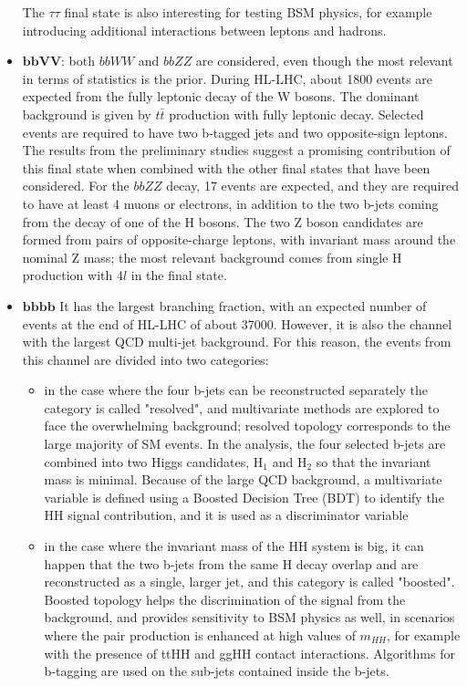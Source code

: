 \begin{itemize}
    The $\tau \tau$ final state is also interesting for testing BSM physics, for example introducing additional interactions between leptons and hadrons.
    \item $\bm{bbVV}$: both $bbWW$ and $bbZZ$ are considered, even though the most relevant in terms of statistics is the prior. During HL-LHC, about 1800 events are expected from the fully leptonic decay of the W bosons. The dominant background is given by $t\bar{t}$ production with fully leptonic decay. Selected events are required to have two b-tagged jets and two opposite-sign leptons. The results from the preliminary studies suggest a promising contribution of this final state when combined with the other final states that have been considered.
    For the $bbZZ$ decay, 17 events are expected, and they are required to have at least 4 muons or electrons, in addition to the two b-jets coming from the decay of one of the H bosons. The two Z boson candidates are formed from pairs of opposite-charge leptons, with invariant mass around the nominal Z mass; the most relevant background comes from single H production with 4$l$ in the final state.
    \item $\bm{bbbb}$ It has the largest branching fraction, with an expected number of events at the end of HL-LHC of about 37000. However, it is also the channel with the largest QCD multi-jet background. For this reason, the events from this channel are divided into two categories: 
    \begin{itemize}
        \item in the case where the four b-jets can be reconstructed separately the category is called "resolved", and multivariate methods are explored to face the overwhelming background; resolved topology corresponds to the large majority of SM events. In the analysis, the four selected b-jets are combined into two Higgs candidates, H$_1$ and H$_2$ so that the invariant mass is minimal. Because of the large QCD background, a multivariate variable is defined using a Boosted Decision Tree (BDT) to identify the HH signal contribution, and it is used as a discriminator variable
        \item in the case where the invariant mass of the HH system is big, it can happen that the two b-jets from the same H decay overlap and are reconstructed as a single, larger jet, and this category is called "boosted". Boosted topology helps the discrimination of the signal from the background, and provides sensitivity to BSM physics as well, in scenarios where the pair production is enhanced at high values of $m_{HH}$, for example with the presence of ttHH and ggHH contact interactions. Algorithms for b-tagging are used on the sub-jets contained inside the b-jets.
    \end{itemize}  
\end{itemize}
